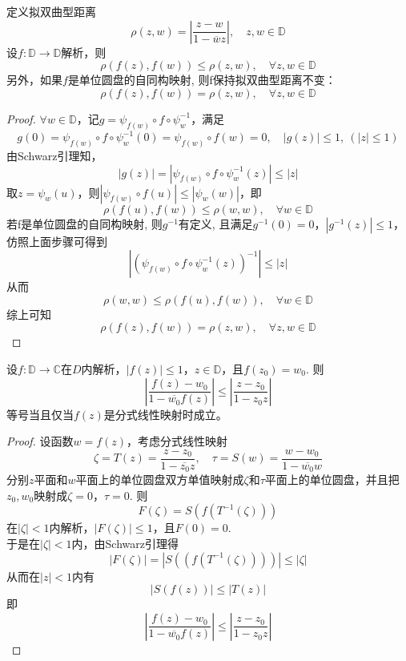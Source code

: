 \begin{theorem}[拟双曲型距离]

    定义拟双曲型距离
    \[\rho(z, w) = \left| \dfrac{z - w}{1 - \overline{w}z} \right|, \quad z, w \in \mathbb{D}\]
    设$f: \mathbb{D} \to \mathbb{D}$解析，则
    \[\rho(f(z), f(w)) \leq \rho(z, w), \quad \forall z, w \in \mathbb{D}\]
    另外，如果$f$是单位圆盘的自同构映射, 则f保持拟双曲型距离不变：
    \[\rho(f(z), f(w)) = \rho(z, w), \quad \forall z, w \in \mathbb{D}\]
    
\end{theorem}

\begin{proof}

    $\forall w \in \mathbb{D}$，记$g = \psi_{f(w)} \circ f \circ \psi^{-1}_{w}$，满足
    \[g(0) = \psi_{f(w)} \circ f \circ \psi^{-1}_{w}(0) = \psi_{f(w)} \circ f(w) = 0, \quad |g(z)| \leq 1,\ (|z| \leq 1)\]
    由\textup{Schwarz}引理知，
    \[|g(z)| = |\psi_{f(w)} \circ f \circ \psi^{-1}_{w}(z)| \leq |z|\]
    取$z = \psi_{w}(u)$，则$|\psi_{f(w)} \circ f(u)| \leq |\psi_{w}(w)|$，即
    \[\rho(f(u), f(w)) \leq \rho(w, w), \quad \forall w \in \mathbb{D}\]
    若f是单位圆盘的自同构映射, 则$g^{-1}$有定义, 且满足$g^{-1}(0) = 0$，$|g^{-1}(z)| \leq 1$，仿照上面步骤可得到
    \[|(\psi_{f(w)} \circ f \circ \psi^{-1}_{w}(z))^{-1}| \leq |z|\]
    从而
    \[\rho(w, w) \leq \rho(f(u), f(w)), \quad \forall w \in \mathbb{D}\]
    综上可知
    \[\rho(f(z), f(w)) = \rho(z, w), \quad \forall z, w \in \mathbb{D}\]

\end{proof}

\begin{theorem}

    设$f:\mathbb{D} \to \mathbb{C}$在$D$内解析，$|f(z)| \leq 1$，$z \in \mathbb{D}$，且$f(z_0) = w_0$. 则
    \[ \left| \dfrac{f(z) - w_0}{1 - \overline{w_0}f(z)} \right| \leq \left| \dfrac{z - z_0}{1 - z_0z} \right|\]
    等号当且仅当$f(z)$是分式线性映射时成立。

\end{theorem}

\begin{proof}
    
    设函数$w = f(z)$，考虑分式线性映射
    \[\zeta = T(z) = \dfrac{z - z_0}{1 - \overline{z_0}z}, \quad \tau = S(w) = \dfrac{w - w_0}{1 - \overline{w_0}w}\]
    分别$z$平面和$w$平面上的单位圆盘双方单值映射成$\zeta$和$\tau$平面上的单位圆盘，并且把$z_0, w_0$映射成$\zeta = 0$，$\tau = 0$. 则
    \[F(\zeta) = S(f(T^{-1}(\zeta)))\]
    在$|\zeta| < 1$内解析，$|F(\zeta)| \leq 1$，且$F(0) = 0$. \\
    于是在$|\zeta| < 1$内，由\textup{Schwarz}引理得
    \[|F(\zeta)| = |S((f(T^{-1}(\zeta))))| \leq |\zeta|\]
    从而在$|z| < 1$内有
    \[|S(f(z))| \leq |T(z)|\]
    即
    \[ \left| \dfrac{f(z) - w_0}{1 - \overline{w_0}f(z)} \right| \leq \left| \dfrac{z - z_0}{1 - z_0z} \right|\]

\end{proof}


